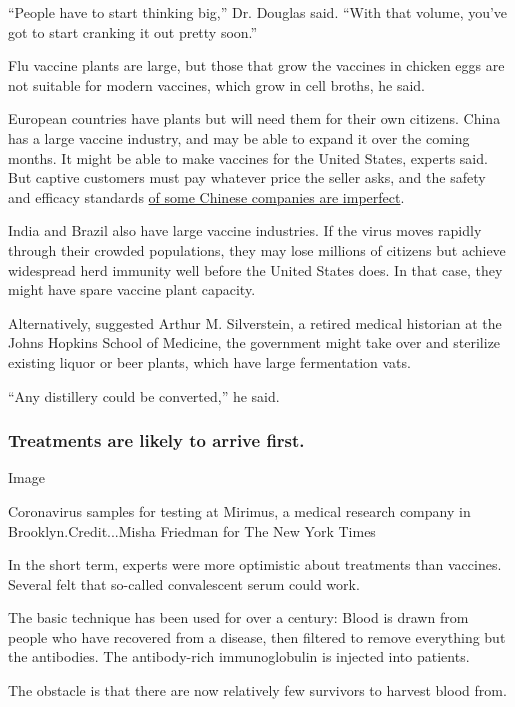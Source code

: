 ``People have to start thinking big,'' Dr. Douglas said. ``With that
volume, you've got to start cranking it out pretty soon.''

Flu vaccine plants are large, but those that grow the vaccines in
chicken eggs are not suitable for modern vaccines, which grow in cell
broths, he said.

European countries have plants but will need them for their own
citizens. China has a large vaccine industry, and may be able to expand
it over the coming months. It might be able to make vaccines for the
United States, experts said. But captive customers must pay whatever
price the seller asks, and the safety and efficacy standards
\href{https://www.nytimes.com/2020/04/16/world/europe/coronavirus-antibody-test-uk.html}{of
some Chinese companies are imperfect}.

India and Brazil also have large vaccine industries. If the virus moves
rapidly through their crowded populations, they may lose millions of
citizens but achieve widespread herd immunity well before the United
States does. In that case, they might have spare vaccine plant capacity.

Alternatively, suggested Arthur M. Silverstein, a retired medical
historian at the Johns Hopkins School of Medicine, the government might
take over and sterilize existing liquor or beer plants, which have large
fermentation vats.

``Any distillery could be converted,'' he said.

\hypertarget{treatments-are-likely-to-arrive-first}{%
\subsubsection{Treatments are likely to arrive
first.}\label{treatments-are-likely-to-arrive-first}}

Image

Coronavirus samples for testing at Mirimus, a medical research company
in Brooklyn.Credit...Misha Friedman for The New York Times

In the short term, experts were more optimistic about treatments than
vaccines. Several felt that so-called convalescent serum could work.

The basic technique has been used for over a century: Blood is drawn
from people who have recovered from a disease, then filtered to remove
everything but the antibodies. The antibody-rich immunoglobulin is
injected into patients.

The obstacle is that there are now relatively few survivors to harvest
blood from.

